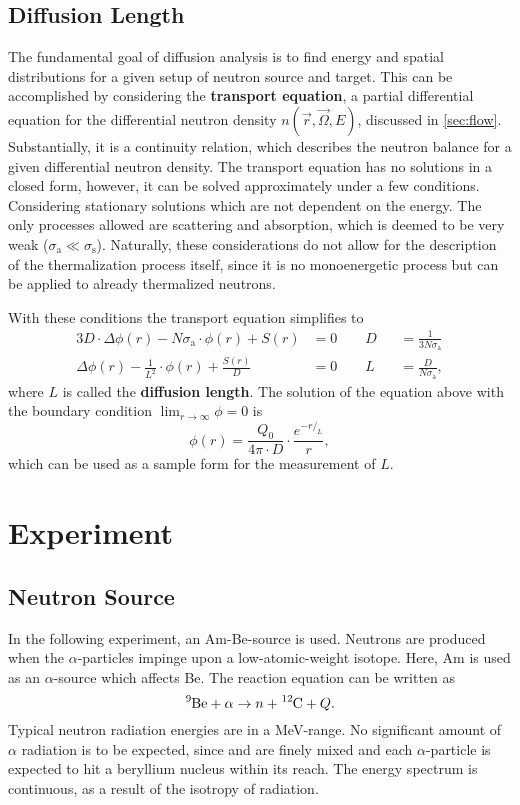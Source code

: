 \section{Diffusion Length}
The fundamental goal of diffusion analysis is to find energy and spatial distributions for a given setup of neutron source and target.
This can be accomplished by considering the \textbf{transport equation}, a partial differential equation for the differential neutron density $n(\vec{r}, \vec{\Omega}, E)$, discussed in \autoref{sec:flow}.
Substantially, it is a continuity relation, which describes the neutron balance for a given differential neutron density.
The transport equation has no solutions in a closed form, however, it can be solved approximately under a few conditions.
Considering stationary solutions which are not dependent on the energy.
The only processes allowed are scattering and absorption, which is deemed to be very weak ($\sigma_\text{a}\ll \sigma_\text{s}$).
Naturally, these considerations do not allow for the description of the thermalization process itself, since it is no monoenergetic process but can be applied to already thermalized neutrons.

With these conditions the transport equation simplifies to
\begin{alignat*}{3}
	D\cdot\Delta\phi(r) - N\sigma_\text{a}\cdot\phi(r) + S(r) &= 0 \qquad D&&=\frac{1}{3N\sigma_\text{a}}\\
	\Delta\phi(r) - \frac{1}{L^2}\cdot\phi(r) + \frac{S(r)}{D} &= 0 \qquad L&&=\frac{D}{N\sigma_\text{a}},
\end{alignat*}
where $L$ is called the \textbf{diffusion length}.
The solution of the equation above with the boundary condition $\lim_{r\rightarrow\infty}\phi = 0$ is
\begin{equation}\label{eq:sol}
	\phi(r) = \frac{Q_0}{4\pi\cdot D}\cdot \frac{e^{-r/_L}}{r},
\end{equation}
which can be used as a sample form for the measurement of $L$.

\chapter{Experiment}
\section{Neutron Source}
In the following experiment, an Am-Be-source is used.
Neutrons are produced when the $\alpha$-particles impinge upon a low-atomic-weight isotope.
Here, Am is used as an $\alpha$-source which affects Be.
The reaction equation can be written as
\begin{equation*}
	\ce{^{9}Be} + \alpha \rightarrow n + \ce{^{12}C} + Q.
\end{equation*}
Typical neutron radiation energies are in a \si{MeV}-range.
No significant amount of $\alpha$ radiation is to be expected, since  and  are finely mixed and each $\alpha$-particle is expected to hit a beryllium nucleus within its reach.
The energy spectrum is continuous, as a result of the isotropy of radiation.

